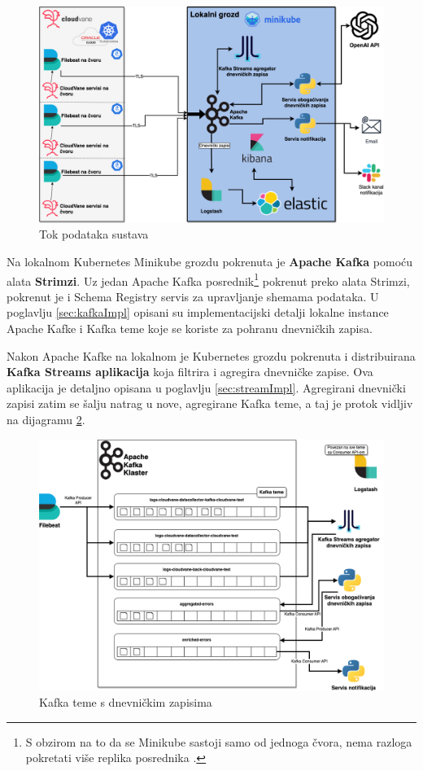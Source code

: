 \documentclass[times, utf8, diplomski]{fer}
\begin{document}
\begin{figure}[htb]
	\centering
	\includegraphics[width=15cm]{images/ThesisData.png}
	\caption[Tok podataka sustava]{Tok podataka  sustava}
	\label{fig:dataDiagram}
\end{figure}

Na lokalnom Kubernetes Minikube grozdu pokrenuta je \textbf{Apache Kafka} pomoću alata \textbf{Strimzi}. Uz jedan Apache Kafka posrednik\footnote{S obzirom na to da se Minikube sastoji samo od jednoga čvora, nema razloga pokretati više replika posrednika .}  pokrenut preko alata Strimzi, pokrenut je i Schema Registry servis za upravljanje shemama podataka. U poglavlju \ref{sec:kafkaImpl} opisani su implementacijski detalji lokalne instance Apache Kafke i Kafka teme koje se koriste za pohranu dnevničkih zapisa.

Nakon Apache Kafke na lokalnom je Kubernetes grozdu pokrenuta i distribuirana \textbf{Kafka Streams aplikacija} koja filtrira i agregira dnevničke zapise. Ova aplikacija je detaljno opisana u poglavlju \ref{sec:streamImpl}. Agregirani dnevnički zapisi zatim se šalju natrag u nove, agregirane Kafka teme, a taj je protok vidljiv na dijagramu \ref{fig:topics}.\\

\begin{figure}[htb]
	\centering
	\includegraphics[width=15cm]{images/KafkaTopics.png}
	\caption[Kafka teme s dnevničkim zapisima]{Kafka teme  s dnevničkim zapisima }
	\label{fig:topics}
\end{figure}
\end{document}
